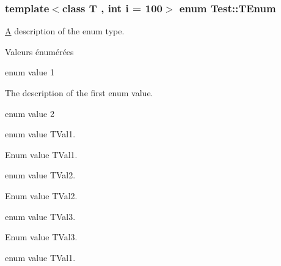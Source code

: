 \subsubsection[{T\+Enum}]{\setlength{\rightskip}{0pt plus 5cm}template$<$class T , int i = 100$>$ enum {\bf Test\+::\+T\+Enum}}\label{class_test_ad8d13fe56b896633273087859b89a1a3}
\hyperlink{class_a}{A} description of the enum type. \begin{Desc}
\item[Valeurs énumérées]\par
\begin{description}
\item[{\em 
\hypertarget{class_test_ad8d13fe56b896633273087859b89a1a3af621232782128e49458adf9069e126d4}{}Val1\label{class_test_ad8d13fe56b896633273087859b89a1a3af621232782128e49458adf9069e126d4}
}]enum value 1

The description of the first enum value. \item[{\em 
\hypertarget{class_test_ad8d13fe56b896633273087859b89a1a3a218603a97012ef8dce0b798d598b2866}{}Val2\label{class_test_ad8d13fe56b896633273087859b89a1a3a218603a97012ef8dce0b798d598b2866}
}]enum value 2 \item[{\em 
\hypertarget{class_test_ad8d13fe56b896633273087859b89a1a3a6db45e8c0b1d4e96e688fd43d343907a}{}T\+Val1\label{class_test_ad8d13fe56b896633273087859b89a1a3a6db45e8c0b1d4e96e688fd43d343907a}
}]enum value T\+Val1.

Enum value T\+Val1. \item[{\em 
\hypertarget{class_test_ad8d13fe56b896633273087859b89a1a3a13b0433f996716c25158cecf9ee545c4}{}T\+Val2\label{class_test_ad8d13fe56b896633273087859b89a1a3a13b0433f996716c25158cecf9ee545c4}
}]enum value T\+Val2.

Enum value T\+Val2. \item[{\em 
\hypertarget{class_test_ad8d13fe56b896633273087859b89a1a3a5642b0033d6d17c4c9bee72133059f26}{}T\+Val3\label{class_test_ad8d13fe56b896633273087859b89a1a3a5642b0033d6d17c4c9bee72133059f26}
}]enum value T\+Val3.

Enum value T\+Val3. \item[{\em 
\hypertarget{class_test_ad8d13fe56b896633273087859b89a1a3a6db45e8c0b1d4e96e688fd43d343907a}{}T\+Val1\label{class_test_ad8d13fe56b896633273087859b89a1a3a6db45e8c0b1d4e96e688fd43d343907a}
}]enum value T\+Val1.


\end{description}
\end{Desc}
